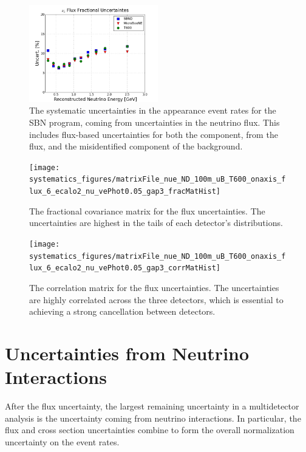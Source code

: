 \begin{figure}[]
    \centering
    \includegraphics[width=0.5\textwidth]{systematics_figures/matrixFile_nue_ND_100m_uB_T600_onaxis_flux_6_ecalo2_nu_vePhot0.05_gap3_fracUncert}
    \caption[Fractional Flux Uncertainties]{The systematic uncertainties in the \nue appearance event rates for the SBN program, coming from uncertainties in the neutrino flux.  This includes flux-based uncertainties for both the \nue component, from the \nue flux, and the \numu misidentified component of the background.}
   \label{fig:sys_flux_uncert_fracUncert}
\end{figure}

\begin{figure}[]
    \centering
    \texttt{[image: systematics\_figures/matrixFile\_nue\_ND\_100m\_uB\_T600\_onaxis\_flux\_6\_ecalo2\_nu\_vePhot0.05\_gap3\_fracMatHist]}
    \caption[Flux Fractional Covariance Matrix]{The fractional covariance matrix for the flux uncertainties.  The uncertainties are highest in the tails of each detector's distributions.}
   \label{fig:syst_flux_fracmatrix}
\end{figure}
\begin{figure}[]
    \centering
    \texttt{[image: systematics\_figures/matrixFile\_nue\_ND\_100m\_uB\_T600\_onaxis\_flux\_6\_ecalo2\_nu\_vePhot0.05\_gap3\_corrMatHist]}
    \caption[Flux Correlation Matrix]{The correlation matrix for the flux uncertainties. The uncertainties are highly correlated across the three detectors, which is essential to achieving a strong cancellation between detectors. }
   \label{fig:syst_flux_corrmatrix}
\end{figure}



\section{Uncertainties from Neutrino Interactions}

After the flux uncertainty, the largest remaining uncertainty in a multidetector analysis is the uncertainty coming from neutrino interactions.  In particular, the flux and cross section uncertainties combine to form the overall normalization uncertainty on the event rates.

